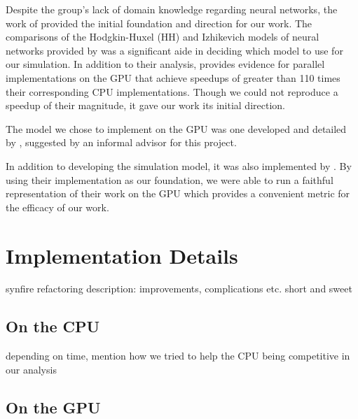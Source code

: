 \documentclass[a4paper]{article}
\begin{document}
Despite the group's lack of domain knowledge regarding neural networks, the work of \cite{accel} provided the initial foundation and direction for our work. The comparisons of the Hodgkin-Huxel (HH) and Izhikevich models of neural networks provided by \cite{accel} was a significant aide in deciding which model to use for our simulation. In addition to their analysis, \cite{accel} provides evidence for parallel implementations on the GPU that achieve speedups of greater than 110 times their corresponding CPU implementations. Though we could not reproduce a speedup of their magnitude, it gave our work its initial direction. 

The model we chose to implement on the GPU was one developed and detailed by \cite{synfire}, suggested by an informal advisor for this project.

In addition to developing the simulation model, it was also implemented by \cite{synfire}. By using their implementation as our foundation, we were able to run a faithful representation of their work on the GPU which provides a convenient metric for the efficacy of our work.




\section{Implementation Details}

{\color{red} synfire refactoring description: improvements, complications etc. short and sweet}


\subsection{On the CPU}

{\color{red} depending on time, mention how we tried to help the CPU being competitive in our analysis}


\subsection{On the GPU}
\end{document}
